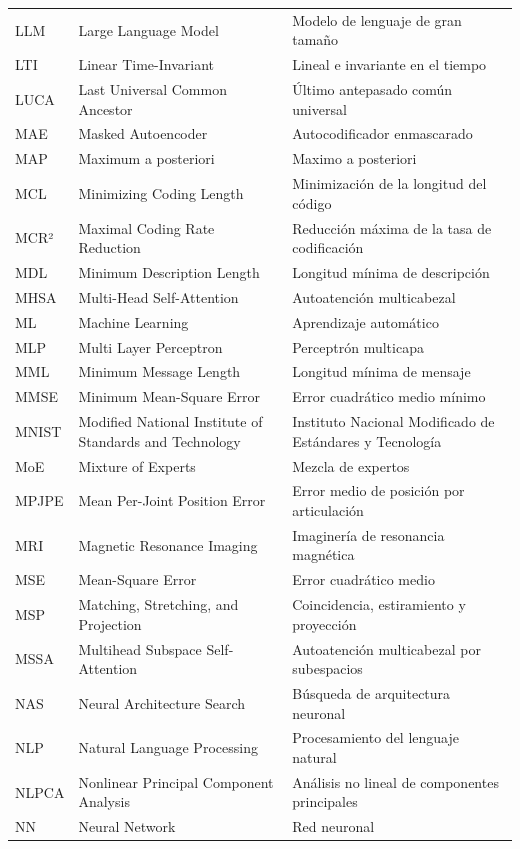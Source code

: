 \documentclass[../book-main_es.tex]{subfiles}
\begin{document}
\begin{longtable}{@{} p{} @{\hspace{1em}} p{} @{\hspace{1em}} p{}}
LLM & Large Language Model & Modelo de lenguaje de gran tamaño \\
LTI & Linear Time-Invariant & Lineal e invariante en el tiempo \\
LUCA & Last Universal Common Ancestor & Último antepasado común universal \\
MAE & Masked Autoencoder & Autocodificador enmascarado \\
MAP & Maximum a posteriori  & Maximo a posteriori  \\
MCL & Minimizing Coding Length & Minimización de la longitud del código \\
MCR² & Maximal Coding Rate Reduction & Reducción máxima de la tasa de codificación \\
MDL & Minimum Description Length & Longitud mínima de descripción \\
MHSA & Multi-Head Self-Attention & Autoatención multicabezal \\
ML & Machine Learning & Aprendizaje automático \\
MLP & Multi Layer Perceptron & Perceptrón multicapa \\
MML & Minimum Message Length & Longitud mínima de mensaje \\
MMSE & Minimum Mean-Square Error & Error cuadrático medio mínimo \\
MNIST & Modified National Institute of Standards and Technology & Instituto Nacional Modificado de Estándares y Tecnología \\
MoE & Mixture of Experts & Mezcla de expertos \\
MPJPE & Mean Per-Joint Position Error & Error medio de posición por articulación \\
MRI & Magnetic Resonance Imaging & Imaginería de resonancia magnética \\
MSE & Mean-Square Error & Error cuadrático medio \\
MSP & Matching, Stretching, and Projection & Coincidencia, estiramiento y proyección \\
MSSA & Multihead Subspace Self-Attention  & Autoatención multicabezal por subespacios \\
NAS & Neural Architecture Search & Búsqueda de arquitectura neuronal \\
NLP  & Natural Language Processing & Procesamiento del lenguaje natural \\
NLPCA & Nonlinear Principal Component Analysis & Análisis no lineal de componentes principales \\
NN & Neural Network & Red neuronal  \\

\end{longtable}
\end{document}
